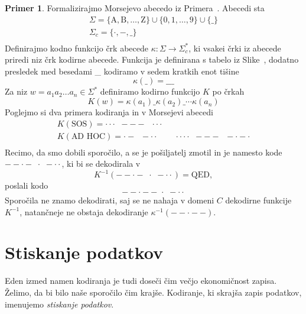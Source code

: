 \documentclass{amsart}
\theoremstyle{definition} %
\newtheorem{primer}[definicija]{Primer}
\theoremstyle{plain} %
\begin{document}
\begin{primer}
    
    Formalizirajmo Morsejevo abecedo iz Primera~. Abecedi sta
    \begin{gather*}
        \Sigma = \{ \text{A},  \text{B}, \ldots, \text{Z} \} \cup \{ 0, 1, \ldots, 9 \} \cup \{ \_ \} \\
        \Sigma_c = \{ \cdot ,-, \_ \} \\
    \end{gather*}
    Definirajmo kodno funkcijo črk abecede $ \kappa \colon \Sigma \to \Sigma_c^* $, ki vsakei črki iz abecede
    priredi niz črk kodirne abecede. Funkcija je definirana s tabelo iz Slike~,
    dodatno presledek med besedami \_  kodiramo v sedem kratkih enot tišine 
    \[
        \kappa(\_) = \_\_\_
    \]
    Za niz $ w = a_1a_2 \ldots a_n \in \Sigma^* $ definiramo kodirno 
    funkcijo $ K $ po črkah
    \[
        K(w) = \kappa(a_1)\_\kappa(a_2)\_\cdots\kappa(a_n)
    \]
    Poglejmo si dva primera kodiranja in v Morsejevi abecedi
    \begin{gather*}
        K(\text{SOS}) = \cdot\cdot\cdot \;\; --- \;\; \cdot\cdot\cdot \\
        K(\text{AD HOC}) = \cdot- \;\; -\cdot\cdot \qquad \cdot\cdot\cdot\cdot \;\; --- \;\; -\cdot-\cdot \\
    \end{gather*}
    Recimo, da smo dobili sporočilo, a se je pošiljatelj zmotil in je namesto kode 
    $ --\cdot- \,\, \cdot \,\, -\cdot\cdot $, ki bi se dekodirala v
    \[
        K^{-1}(--\cdot- \,\, \cdot \,\, -\cdot\cdot) = \text{QED},
        \]
    poslali kodo
    \[
        --\cdot-- \,\, \cdot \,\, -\cdot\cdot
    \]
    Sporočila ne znamo dekodirati, saj se ne nahaja v domeni $ C $ dekodirne funkcije $ K^{-1} $,
    natančneje ne obstaja dekodiranje $ \kappa^{-1}(--\cdot--) $.

\end{primer}

\section{Stiskanje podatkov}

Eden izmed namen kodiranja je tudi doseči čim večjo ekonomičnost zapisa. Želimo, da bi bilo naše sporočilo
čim krajše. Kodiranje, ki skrajša zapis podatkov, imenujemo \textit{stiskanje podatkov}.
\end{document}
